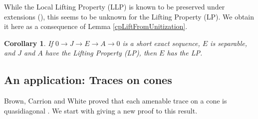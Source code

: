 \documentclass{article}%
\newtheorem{corollary}[theorem]{Corollary}
\begin{document}
While the Local Lifting Property (LLP) is known to be preserved under extensions (\cite[Cor. 2.6.]{Kirchberg}), this seems to be unknown for the Lifting Property (LP). We obtain it here as a consequence of  Lemma \ref{cpLiftFromUnitization}.

\begin{corollary}\label{LP} If $0\to J\to E\to A\to 0$ is a short exact sequence,  $E$ is separable, and $J$ and $A$ have the Lifting Property (LP), then $E$ has the LP.
\end{corollary}

\medskip


\subsection{An application: Traces on cones}


Brown, Carrion and White proved that each amenable trace on a cone is quasidiagonal \cite{BCW}. We start with giving a new proof to this  result.
\end{document}
